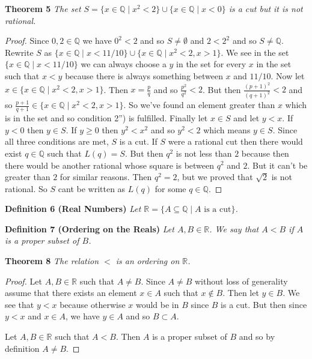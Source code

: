 \documentclass{article}
\begin{document}
\begin{flushleft}
\textbf{Theorem 5}
\textsl{The set $S=\{x \in \mathbb{Q} \mid x^2 < 2\} \cup \{x \in \mathbb{Q} \mid x < 0\}$ is a cut but it is not rational.}
\begin{proof}
Since $0,2 \in \mathbb{Q}$ we have $0^2<2$ and so $S \neq \emptyset$ and $2<2^2$ and so $S \neq \mathbb{Q}$. Rewrite $S$ as $\{x \in \mathbb{Q} \mid x<11/10\} \cup \{x \in \mathbb{Q} \mid x^2<2, x>1\}$. We see in the set $\{x \in \mathbb{Q} \mid x<11/10\}$ we can always choose a $y$ in the set for every $x$ in the set such that $x<y$ because there is always something between $x$ and $11/10$. Now let $x \in \{x \in \mathbb{Q} \mid x^2<2, x>1\}$. Then $x=\frac{p}{q}$ and so $\frac{p^2}{q^2}<2$. But then $\frac{(p+1)^2}{(q+1)^2}<2$ and so $\frac{p+1}{q+1} \in \{x \in \mathbb{Q} \mid x^2<2, x>1\}$. So we've found an element greater than $x$ which is in the set and so condition 2'') is fulfilled. Finally let $x \in S$ and let $y<x$. If $y<0$ then $y \in S$. If $y \geq 0$ then $y^2<x^2$ and so $y^2<2$ which means $y \in S$. Since all three conditions are met, $S$ is a cut. If $S$ were a rational cut then there would exist $q \in \mathbb{Q}$ such that $L(q)=S$. But then $q^2$ is not less than $2$ because then there would be another rational whose square is between $q^2$ and $2$. But it can't be greater than $2$ for similar reasons. Then $q^2=2$, but we proved that $\sqrt{2}$ is not rational. So $S$ cant be written as $L(q)$ for some $q \in \mathbb{Q}$.
\end{proof}

\textbf{Definition 6 (Real Numbers)}
\textsl{Let $\mathbb{R} = \{A \subseteq \mathbb{Q} \mid A \text{ is a cut}\}$.}
\newline

\textbf{Definition 7 (Ordering on the Reals)}
\textsl{Let $A, B \in \mathbb{R}$. We say that $A < B$ if $A$ is a proper subset of $B$.}
\newline

\textbf{Theorem 8}
\textsl{The relation $<$ is an ordering on $\mathbb{R}$.}
\begin{proof}
Let $A, B \in \mathbb{R}$ such that $A \neq B$. Since $A \neq B$ without loss of generality assume that there exists an element $x \in A$ such that $x \notin B$. Then let $y \in B$. We see that $y<x$ because otherwise $x$ would be in $B$ since $B$ is a cut. But then since $y<x$ and $x \in A$, we have $y \in A$ and so $B \subset A$.\newline

Let $A, B \in \mathbb{R}$ such that $A<B$. Then $A$ is a proper subset of $B$ and so by definition $A \neq B$.\newline


\end{proof}
\end{flushleft}
\end{document}
